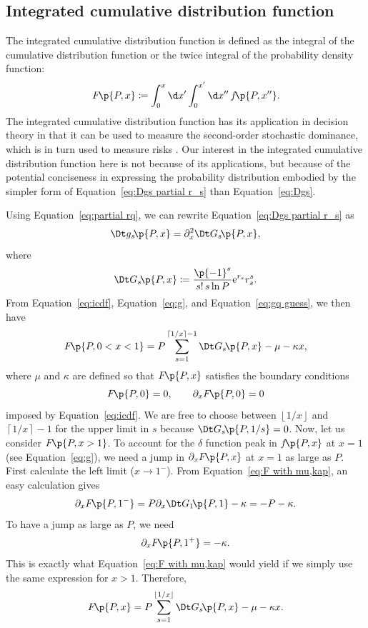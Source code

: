 \documentclass[oneside,12pt,final]{ucthesis-CA2012}
\newcommand{\mrm}[1]{\mathrm{#1}}
\newcommand{\dlt}{\delta}
\newcommand{\kap}{\kappa}
\newcommand{\ceq}{\coloneqq}
\newcommand{\e}{\mrm{e}}
\newcommand{\fr}{\frac}
\newcommand{\fc}[2]{#1\mathchoice{\!}{\!}{}{}\p{#2}} %
\newcommand\floor[1]{\left\lfloor#1\right\rfloor}
\newcommand\ceil[1]{\left\lceil#1\right\rceil}
\begin{document}
\begin{mainmatter}
\chapter{Integrated cumulative distribution function}
\label{sec:icdf}

The integrated cumulative distribution function is defined
as the integral of the cumulative distribution function
or the twice integral of the probability density function:
\begin{equation}
	\label{eq:icdf}
	\fc F{P,x}\ceq\int_0^x\d x'\int_0^{x'}\d x''\,\fc f{P,x''}.
\end{equation}
The integrated cumulative distribution function has its application in decision theory
in that it can be used to measure the second-order stochastic dominance,
which is in turn used to measure risks \cite{Hanoch_Levy_1969}.
Our interest in the integrated cumulative distribution function here is not
because of its applications,
but because of the potential conciseness in expressing the probability distribution
embodied by the simpler form of Equation~\ref{eq:Dgs partial r_s} than Equation~\ref{eq:Dgs}.

Using Equation~\ref{eq:partial rq}, we can rewrite Equation~\ref{eq:Dgs partial r_s} as
\[\fc{\Dt g_s}{P,x}=\partial_x^2\fc{\Dt G_s}{P,x},\]
where
\begin{equation}
	\label{eq:DGs}
	\fc{\Dt G_s}{P,x}\ceq\fr{\p{-1}^s}{s!\,s\ln P}\e^{r_s}r_s^s.
\end{equation}
From Equation~\ref{eq:icdf}, Equation~\ref{eq:g}, and Equation~\ref{eq:gq guess}, we then have
\begin{equation}
	\label{eq:F with mu,kap}
	\fc F{P,0<x<1}=P\sum_{s=1}^{\ceil{1/x}-1}\fc{\Dt G_s}{P,x}-\mu-\kap x,
\end{equation}
where $\mu$ and $\kap$ are defined so that $\fc F{P,x}$ satisfies the boundary conditions
\[\fc F{P,0}=0,\qquad\partial_x\fc F{P,0}=0\]
imposed by Equation~\ref{eq:icdf}.
We are free to choose between $\floor{1/x}$ and $\ceil{1/x}-1$ for the upper limit in $s$
because $\fc{\Dt G_s}{P,1/s}=0$.
Now, let us consider $\fc F{P,x>1}$.
To account for the $\dlt$ function peak in $\fc f{P,x}$ at $x=1$
(see Equation~\ref{eq:g}),
we need a jump in $\partial_x\fc F{P,x}$ at $x=1$ as large as $P$.
First calculate the left limit ($x\to 1^-$).
From Equation~\ref{eq:F with mu,kap}, an easy calculation gives
\[\partial_x\fc F{P,1^-}=P\partial_x\fc{\Dt G_1}{P,1}-\kap=-P-\kap.\]
To have a jump as large as $P$, we need
\begin{equation}
	\label{eq:partial x F 1+ with kap}
	\partial_x\fc F{P,1^+}=-\kap.
\end{equation}
This is exactly what Equation~\ref{eq:F with mu,kap} would yield if we simply
use the same expression for $x>1$.
Therefore,
\begin{equation}
	\label{eq:F full with mu,kap}
	\fc F{P,x}=P\sum_{s=1}^{\floor{1/x}}\fc{\Dt G_s}{P,x}-\mu-\kap x.
\end{equation}


\end{mainmatter}
\end{document}
